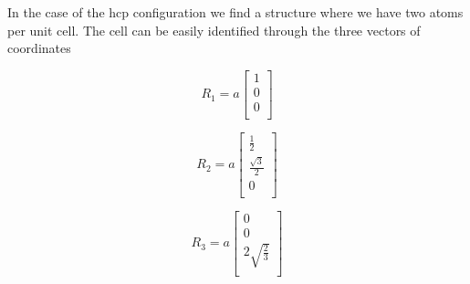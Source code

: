 \documentclass[a4paper]{article}
\begin{document}
In the case of the hcp configuration we find a structure where we have two atoms per unit cell.
The cell can be easily identified through the three vectors of coordinates\\
\begin{minipage}{0.3\textwidth}
\centering
\begin{equation*}
R_1 = a
\begin{bmatrix}
	1 \\
    0 \\
    0 \\
    
\end{bmatrix}
\end{equation*}

\end{minipage}
\begin{minipage}{0.3\textwidth}
\centering
\begin{equation*}
R_2 = a
\begin{bmatrix}
    \frac{1}{2} \\
    \frac{\sqrt{3}}{2}  \\
    0 \\
\end{bmatrix}
\end{equation*}
\end{minipage}
\begin{minipage}{0.3\textwidth}
\centering
\begin{equation*}
R_3 = a
\begin{bmatrix}
    0 \\
    0 \\
    2\sqrt{\frac{2}{3}} \\
\end{bmatrix}
\end{equation*}
\end{minipage}
\end{document}
